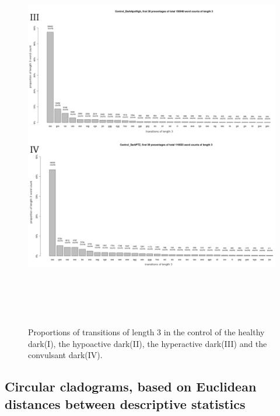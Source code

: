 \documentclass[a4paper,12pt]{article}
\begin{document}
\begin{figure}[h!]
\begin{center}
\includegraphics[width=15cm,height=17cm]{transitionsperboutlength2.png}
\caption{Proportions of transitions of length 3 in the control of the healthy dark(I), the hypoactive dark(II), the hyperactive dark(III) and the convulsant dark(IV).}
\end{center}
\end{figure}

\subsection{Circular cladograms, based on Euclidean distances between descriptive statistics}
\end{document}
